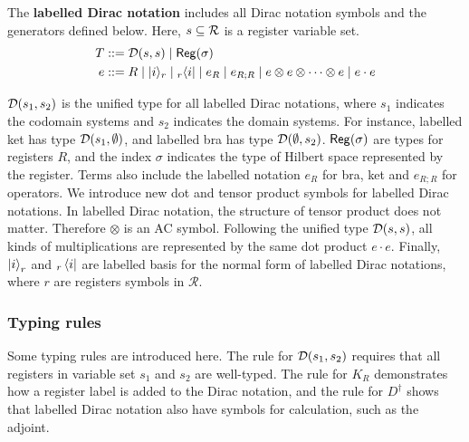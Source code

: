 
\begin{definition}
  The \textbf{labelled Dirac notation} includes all Dirac notation symbols and the generators defined below.
  Here, $s\subseteq \mathcal{R}$ is a register variable set.
  \begin{align*}
    T & ::= \mathcal{D}(s,s) \mid \mathsf{Reg}(\sigma) \\
    e & ::= R \mid |i\rangle_r \mid {}_r\langle i| \mid e_R \mid e_{R;R} \mid
    e \otimes e \otimes \cdots \otimes e \mid e \cdot e \\
  \end{align*}
\end{definition}

$\mathcal{D}(s_1, s_2)$ is the unified type for all labelled Dirac notations, where $s_1$ indicates the codomain systems and $s_2$ indicates the domain systems. For instance, labelled ket has type $\mathcal{D}(s_1, \emptyset)$, and labelled bra has type $\mathcal{D}(\emptyset, s_2)$.
$\mathsf{Reg}(\sigma)$ are types for registers $R$, and the index $\sigma$ indicates the type of Hilbert space represented by the register.
Terms also include the labelled notation $e_R$ for bra, ket and $e_{R;R}$ for operators. We introduce new dot and tensor product symbols for labelled Dirac notations. In labelled Dirac notation, the structure of tensor product does not matter. Therefore $\otimes$ is an AC symbol.
Following the unified type $\mathcal{D}(s,s)$, all kinds of multiplications are represented by the same dot product $e \cdot e$.
Finally, $\ket{i}_r$ and ${}_r\bra{i}$ are labelled basis for the normal form of labelled Dirac notations, where $r$ are registers symbols in $\mathcal{R}$. 

\subsubsection*{Typing rules}
Some typing rules are introduced here.
The rule for $\mathcal{D}(s_1, s_2)$ requires that all registers in variable set $s_1$ and $s_2$ are well-typed.
The rule for $K_R$ demonstrates how a register label is added to the Dirac notation, and the rule for $D^\dagger$ shows that labelled Dirac notation also have symbols for calculation, such as the adjoint.

